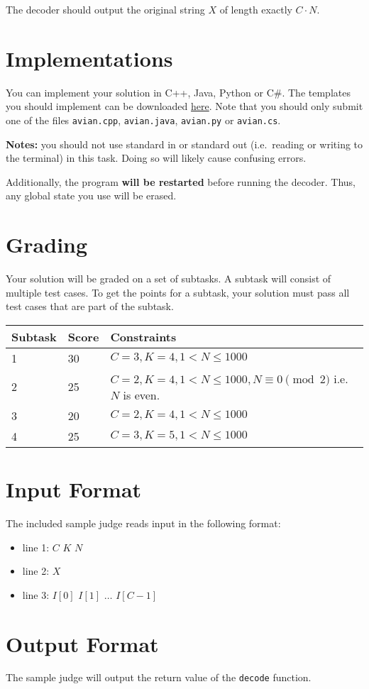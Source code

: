 The decoder should output the original string $X$ of length exactly $C \cdot N$.

\section*{Implementations}
You can implement your solution in C++, Java, Python or C\#.
The templates you should implement can be downloaded \href{http://progolymp.se/uploads/avian.zip}{here}.
Note that you should only submit one of the files \texttt{avian.cpp}, \texttt{avian.java}, \texttt{avian.py} or \texttt{avian.cs}.

\textbf{Notes:} you should not use standard in or standard out (i.e.\ reading or writing to the terminal) in this task.
Doing so will likely cause confusing errors.

Additionally, the program \textbf{will be restarted} before running the decoder.
Thus, any global state you use will be erased.

\section*{Grading}
Your solution will be graded on a set of subtasks.
A subtask will consist of multiple test cases.
To get the points for a subtask, your solution must pass all test cases that are part of the subtask.

\noindent
\begin{tabular}{| l | l | l |}
\hline
Subtask & Score & Constraints \\ \hline
1       & 30    & $C = 3, K = 4, 1 < N \le 1000$ \\ \hline
2       & 25    & $C = 2, K = 4, 1 < N \le 1000, N \equiv 0 \pmod{2}$ i.e. $N$ is even. \\ \hline
3       & 20    & $C = 2, K = 4, 1 < N \le 1000$ \\ \hline
4       & 25    & $C = 3, K = 5, 1 < N \le 1000$ \\ \hline
\end{tabular}

\section*{Input Format}
The included sample judge reads input in the following format:
\begin{itemize}
	\item line 1: $C$ $K$ $N$
	\item line 2: $X$
	\item line 3: $I[0]$ $I[1]$ $\ldots$ $I[C - 1]$
\end{itemize}

\section*{Output Format}
The sample judge will output the return value of the \texttt{decode} function.
